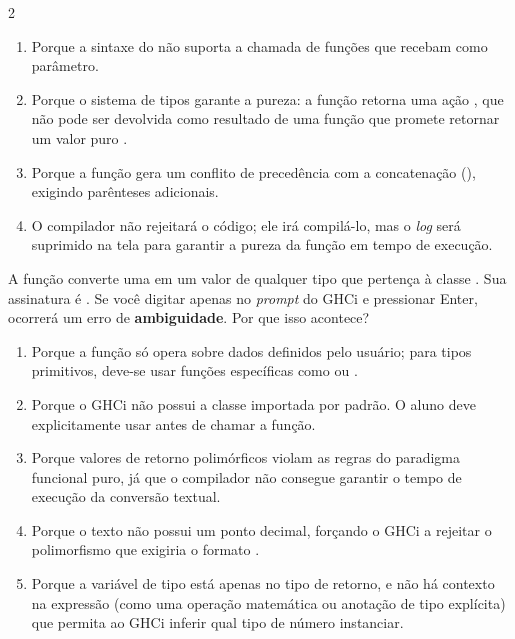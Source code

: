 \documentclass[a4paper,10pt,brazil]{article}
\begin{document}
\begin{multicols}{2}
\begin{enumerate}
  \item Porque a sintaxe do  não suporta a chamada de funções que recebam  como parâmetro.

  \item Porque o sistema de tipos garante a pureza: a função  retorna uma ação , que não pode ser devolvida como resultado de uma função que promete retornar um valor puro .

  \item Porque a função  gera um conflito de precedência com a concatenação (\haskellinline{++}), exigindo parênteses adicionais.

  \item O compilador não rejeitará o código; ele irá compilá-lo, mas o \emph{log} será suprimido na tela para garantir a pureza da função em tempo de execução.


\end{enumerate}

A função  converte uma  em um valor de qualquer tipo que pertença à classe . Sua assinatura é . 
Se você digitar apenas  no \emph{prompt} do GHCi e pressionar Enter, ocorrerá um erro de \textbf{ambiguidade}. Por que isso acontece?

\begin{enumerate}
  \item Porque a função  só opera sobre dados definidos pelo usuário; para tipos primitivos, deve-se usar funções específicas como  ou .

  \item Porque o GHCi não possui a classe  importada por padrão. O aluno deve explicitamente usar  antes de chamar a função.

  \item Porque valores de retorno polimórficos violam as regras do paradigma funcional puro, já que o compilador não consegue garantir o tempo de execução da conversão textual.

  \item Porque o texto  não possui um ponto decimal, forçando o GHCi a rejeitar o polimorfismo que exigiria o formato .

  \item Porque a variável de tipo  está apenas no tipo de retorno, e não há contexto na expressão (como uma operação matemática ou anotação de tipo explícita) que permita ao GHCi inferir qual tipo de número instanciar.


\end{enumerate}


\end{multicols}
\end{document}
